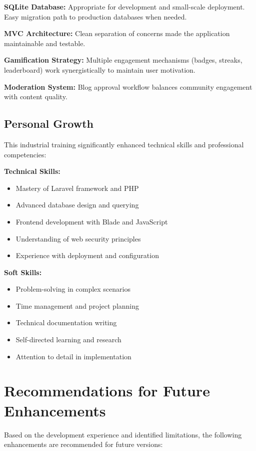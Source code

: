 \documentclass[12pt,a4paper]{report}
\newcommand{\JustifiedNormal}{\fontsize{12}{14}\selectfont\justifying\setlength{\parindent}{0pt}}
\begin{document}
\textbf{SQLite Database:} Appropriate for development and small-scale deployment. Easy migration path to production databases when needed.

\textbf{MVC Architecture:} Clean separation of concerns made the application maintainable and testable.

\textbf{Gamification Strategy:} Multiple engagement mechanisms (badges, streaks, leaderboard) work synergistically to maintain user motivation.

\textbf{Moderation System:} Blog approval workflow balances community engagement with content quality.

\subsection{Personal Growth}
\JustifiedNormal
This industrial training significantly enhanced technical skills and professional competencies:

\textbf{Technical Skills:}
\begin{itemize}
  \item Mastery of Laravel framework and PHP
  \item Advanced database design and querying
  \item Frontend development with Blade and JavaScript
  \item Understanding of web security principles
  \item Experience with deployment and configuration
\end{itemize}

\textbf{Soft Skills:}
\begin{itemize}
  \item Problem-solving in complex scenarios
  \item Time management and project planning
  \item Technical documentation writing
  \item Self-directed learning and research
  \item Attention to detail in implementation
\end{itemize}

\section{Recommendations for Future Enhancements}
\JustifiedNormal
Based on the development experience and identified limitations, the following enhancements are recommended for future versions:
\end{document}
